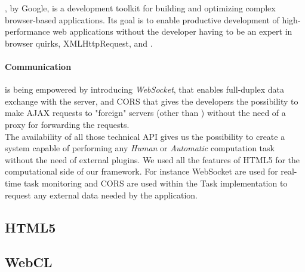 , by Google, is a development toolkit for building and optimizing
complex browser-based applications. Its goal is to enable productive development
of high-performance web applications without the developer having to be an expert
in browser quirks, XMLHttpRequest, and \js{}.\\



\paragraph{Communication} is being empowered by
introducing \emph{WebSocket}, that enables full-duplex data exchange with the
server, and \ac{CORS} that gives the developers the possibility to make \ac{AJAX}
requests to "foreign" servers (other than ) without the need of
a proxy for forwarding the requests.\\


The availability of all those technical API gives us the possibility to create a
system capable of performing any \emph{Human} or \emph{Automatic} computation
task without the need of external plugins. We used all the features of HTML5
for the computational side of our framework. For instance WebSocket are used
for real-time task monitoring and \ac{CORS} are used within the Task implementation
to request any external data needed by the application.

\subsection{\acs{HTML}5}
\label{sec:bg:web:html5}



\subsection{WebCL}
\label{sec:bg:web:webcl}
